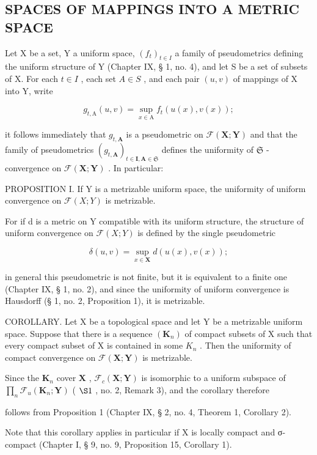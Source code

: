 \subsection{SPACES OF MAPPINGS INTO A METRIC SPACE}

Let X be a set, Y a uniform space, \((f_{t})_{t\in I}\) a family of pseudometrics defining the uniform structure of Y (Chapter IX, § 1, no. 4), and let S be a set of subsets of X. For each \(t\in I\) , each set \(A\in S\) , and each pair \((u,v)\) of mappings of X into Y, write

\[
g _ {t, \mathrm{A}} (u, v) = \sup _ {x \in \mathrm{A}} f _ {t} (u (x), v (x));
\]

it follows immediately that \(g_{t,\mathbf{A}}\) is a pseudometric on \(\mathcal{F}(\mathbf{X};\mathbf{Y})\) and that the family of pseudometrics \((g_{t,\mathbf{A}})_{t\in \mathbf{I},\mathbf{A}\in \mathfrak{S}}\) defines the uniformity of \(\mathfrak{S}\) -convergence on \(\mathcal{F}(\mathbf{X};\mathbf{Y})\) . In particular:

PROPOSITION I. If Y is a metrizable uniform space, the uniformity of uniform convergence on \(\mathcal{F}(X;Y)\) is metrizable.

For if d is a metric on Y compatible with its uniform structure, the structure of uniform convergence on \(\mathcal{F}(X;Y)\) is defined by the single pseudometric

\[
\delta (u, v) = \sup _ {x \in \mathbf {X}} d (u (x), v (x));
\]

in general this pseudometric is not finite, but it is equivalent to a finite one (Chapter IX, § 1, no. 2), and since the uniformity of uniform convergence is Hausdorff (§ 1, no. 2, Proposition 1), it is metrizable.

COROLLARY. Let X be a topological space and let Y be a metrizable uniform space. Suppose that there is a sequence \((\mathbf{K}_{n})\) of compact subsets of X such that every compact subset of X is contained in some \(K_{n}\) . Then the uniformity of compact convergence on \(\mathcal{F}(\mathbf{X};\mathbf{Y})\) is metrizable.

Since the \(\mathbf{K}_n\) cover \(\mathbf{X}\) , \(\mathcal{F}_c(\mathbf{X};\mathbf{Y})\) is isomorphic to a uniform subspace of \(\prod_{n}\mathcal{F}_{u}(\mathbf{K}_{n};\mathbf{Y})\) ( \(\S 1\) , no. 2, Remark 3), and the corollary therefore

follows from Proposition 1 (Chapter IX, § 2, no. 4, Theorem 1, Corollary 2).

Note that this corollary applies in particular if X is locally compact and σ-compact (Chapter I, § 9, no. 9, Proposition 15, Corollary 1).

